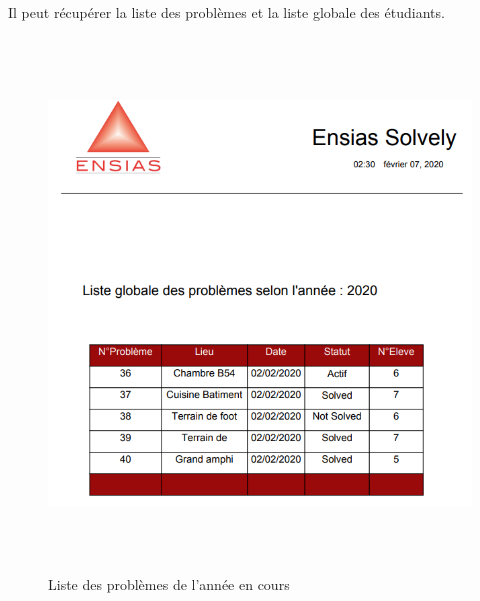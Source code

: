 \documentclass[11.5pt]{report}
\begin{document}
\newpage
Il peut récupérer la liste des problèmes et la liste globale des étudiants.\\
\begin{figure}[h]
	
	\begin{center}
		\includegraphics[width=500pt,height=400pt]{listproblems.png} 
		\caption{Liste des problèmes de l'année en cours}
	\end{center}
	
\end{figure}
\newpage
\end{document}
